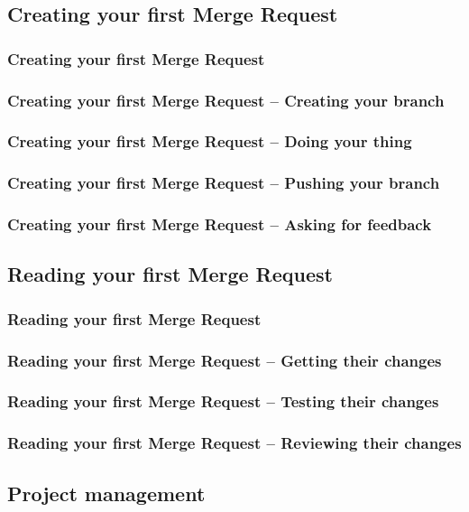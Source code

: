 \documentclass{beamer}
\begin{document}
\subsection{Creating your first Merge Request}

\begin{frame}[fragile]
  \frametitle{Creating your first Merge Request}
\end{frame}

\begin{frame}[fragile]
  \frametitle{Creating your first Merge Request -- Creating your branch}
\end{frame}

\begin{frame}[fragile]
  \frametitle{Creating your first Merge Request -- Doing your thing}
\end{frame}

\begin{frame}[fragile]
  \frametitle{Creating your first Merge Request -- Pushing your branch}
\end{frame}

\begin{frame}[fragile]
  \frametitle{Creating your first Merge Request -- Asking for feedback}
\end{frame}

\subsection{Reading your first Merge Request}

\begin{frame}[fragile]
  \frametitle{Reading your first Merge Request}
\end{frame}

\begin{frame}[fragile]
  \frametitle{Reading your first Merge Request -- Getting their changes}
\end{frame}

\begin{frame}[fragile]
  \frametitle{Reading your first Merge Request -- Testing their changes}
\end{frame}

\begin{frame}[fragile]
  \frametitle{Reading your first Merge Request -- Reviewing their changes}  %
\end{frame}

\subsection{Project management}
\end{document}
